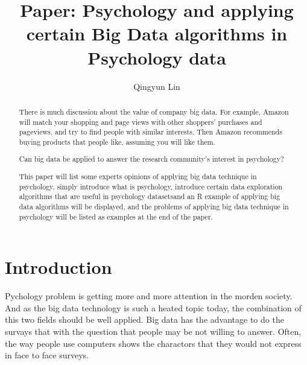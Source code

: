 
\title{Paper: Psychology and applying certain Big Data algorithms in Psychology data}


\author{Qingyun Lin}


\renewcommand{\shortauthors}{G. v. Laszewski}


\begin{abstract}
There is much discussion about the value of company big data. 
For example, Amazon will match your shopping and page views with 
other shoppers’ purchases and pageviews, and try to find people with 
similar interests. Then Amazon recommends buying products that people 
like, assuming you will like them.

Can big data be applied to answer the research community’s interest 
in psychology?

This paper will list some experts opinions of applying big data 
technique in psychology, simply introduce what is psychology, 
introduce certain data exploration algorithms that are useful in 
psychology datasetsand an R example of applying big data algorithms 
will be displayed, and the problems of applying big data technique 
in psychology will be listed as examples at the end of the paper. 

\end{abstract}



\maketitle

\section{Introduction}

Pychology problem is getting more and more attention in the morden
society. And as the big data technology is such a heated topic 
today, the combination of this two fields should be well applied.
Big data has the advantage to do the survays that with the question 
that people may be not willing to answer. 
Often, the way people use computers shows the charactors that they
 would not express in face to face surveys.


